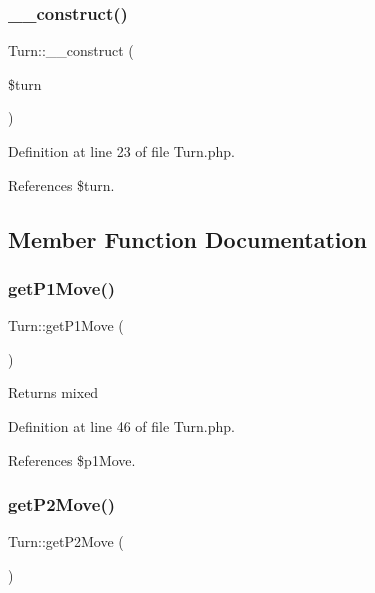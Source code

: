 \subsubsection{\texorpdfstring{\+\_\+\+\_\+construct()}{\_\_construct()}}
{\footnotesize\ttfamily Turn\+::\+\_\+\+\_\+construct (\begin{DoxyParamCaption}\item[{}]{\$turn }\end{DoxyParamCaption})}



Definition at line 23 of file Turn.\+php.



References \$turn.



\subsection{Member Function Documentation}
\mbox{\label{class_turn_a1992de1a6621d3034816c0c85b9fccd2}} 
\subsubsection{\texorpdfstring{get\+P1\+Move()}{getP1Move()}}
{\footnotesize\ttfamily Turn\+::get\+P1\+Move (\begin{DoxyParamCaption}{ }\end{DoxyParamCaption})}

\begin{DoxyReturn}{Returns}
mixed 
\end{DoxyReturn}


Definition at line 46 of file Turn.\+php.



References \$p1\+Move.

\mbox{\label{class_turn_a1972418b9242347a2d0b827c1d428c2c}} 
\subsubsection{\texorpdfstring{get\+P2\+Move()}{getP2Move()}}
{\footnotesize\ttfamily Turn\+::get\+P2\+Move (\begin{DoxyParamCaption}{ }\end{DoxyParamCaption})}

